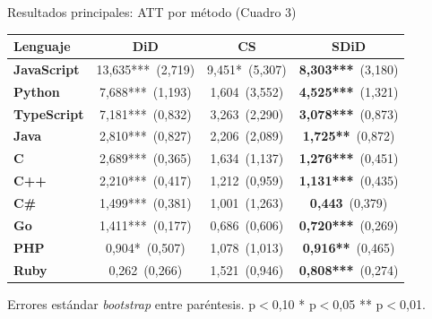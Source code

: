 \documentclass[10pt,aspectratio=169]{beamer}
\begin{document}
\begin{frame}{Resultados principales: ATT por método (Cuadro 3)}
\vspace{0.2em}
\renewcommand{\arraystretch}{1.22}
\setlength{\tabcolsep}{8pt}
\centering
\footnotesize
\begin{tabular}{lccc}
\toprule
\textbf{Lenguaje} & \textbf{DiD} & \textbf{CS} & \textbf{SDiD} \\
\midrule
\textbf{JavaScript} & 13,635*** \,(2,719) & 9,451*  \,(5,307) & \alert{\textbf{8,303***}} \,(3,180) \\
\textbf{Python}     &  7,688*** \,(1,193) & 1,604   \,(3,552) & \alert{\textbf{4,525***}} \,(1,321) \\
\textbf{TypeScript} &  7,181*** \,(0,832) & 3,263   \,(2,290) & \alert{\textbf{3,078***}} \,(0,873) \\
\textbf{Java}       &  2,810*** \,(0,827) & 2,206   \,(2,089) & \alert{\textbf{1,725**}}  \,(0,872) \\
\textbf{C}          &  2,689*** \,(0,365) & 1,634   \,(1,137) & \alert{\textbf{1,276***}} \,(0,451) \\
\textbf{C++}        &  2,210*** \,(0,417) & 1,212   \,(0,959) & \alert{\textbf{1,131***}} \,(0,435) \\
\textbf{C\#}        &  1,499*** \,(0,381) & 1,001   \,(1,263) & \alert{\textbf{0,443}}    \,(0,379) \\
\textbf{Go}         &  1,411*** \,(0,177) & 0,686   \,(0,606) & \alert{\textbf{0,720***}} \,(0,269) \\
\textbf{PHP}        &  0,904*   \,(0,507) & 1,078   \,(1,013) & \alert{\textbf{0,916**}}  \,(0,465) \\
\textbf{Ruby}       &  0,262    \,(0,266) & 1,521   \,(0,946) & \alert{\textbf{0,808***}} \,(0,274) \\
\bottomrule
\end{tabular}

\vspace{0.5em}
\footnotesize Errores estándar \textit{bootstrap} entre paréntesis. \quad * p$<$0,10 \quad ** p$<$0,05 \quad *** p$<$0,01.
\end{frame}
\end{document}
